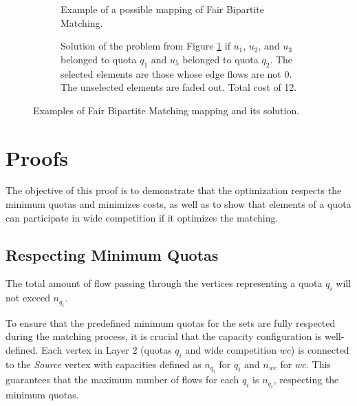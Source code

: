             \begin{figure}[!ht]
                \centering
                \begin{subfigure}[!ht]{.95\textwidth}
                    \centering
                    
                    \caption{Example of a possible mapping of Fair Bipartite Matching.}
                    \label{fig:mapeamento}
                \end{subfigure}
                \hfill
                \begin{subfigure}[!ht]{0.8\textwidth}
                    \centering
                    
                    \caption[Solution of the problem from Figure \ref{fig:mapeamento}]{Solution of the problem from Figure \ref{fig:mapeamento} if $u_1$, $u_2$, and $u_3$ belonged to quota $q_1$ and $u_5$ belonged to quota $q_2$. The selected elements are those whose edge flows are not 0. The unselected elements are faded out. Total cost of 12.}
                    \label{fig:solucao}
                \end{subfigure}
                \caption{Examples of Fair Bipartite Matching mapping and its solution.}
                \label{fig:matching_examples}
            \end{figure}
        
        \section{Proofs}
        
        The objective of this proof is to demonstrate that the optimization respects the minimum quotas and minimizes costs, as well as to show that elements of a quota can participate in wide competition if it optimizes the matching.
        
        \subsection{Respecting Minimum Quotas}
        
        \begin{lemma}
           The total amount of flow passing through the vertices representing a quota $q_i$ will not exceed $n_{q_i}$.
        \end{lemma}
        
        To ensure that the predefined minimum quotas for the sets are fully respected during the matching process, it is crucial that the capacity configuration is well-defined. Each vertex in Layer 2 (quotas $q_i$ and wide competition $wc$) is connected to the \textit{Source} vertex with capacities defined as $n_{q_i}$ for $q_i$ and $n_{wc}$ for $wc$. This guarantees that the maximum number of flows for each $q_i$ is $n_{q_i}$, respecting the minimum quotas.
        
